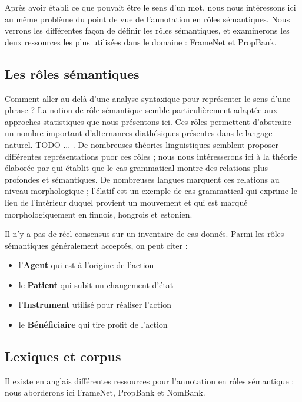 Après avoir établi ce que pouvait être le sens d'un mot, nous nous intéressons
ici au même problème du point de vue de l'annotation en rôles sémantiques. Nous
verrons les différentes façon de définir les rôles sémantiques, et examinerons
les deux ressources les plus utilisées dans le domaine : FrameNet et PropBank.

\subsection{Les rôles sémantiques}

Comment aller au-delà d'une analyse syntaxique pour représenter le sens d'une
phrase ? La notion de rôle sémantique semble particulièrement adaptée aux
approches statistiques que nous présentons ici. Ces rôles permettent
d'abstraire un nombre important d'alternances diathésiques présentes dans le
langage naturel. TODO ... . De nombreuses théories linguistiques semblent
proposer différentes représentations puor ces rôles ; nous nous intéresserons
ici à la théorie élaborée par \cite{fillmore1968case} qui établit que le cas
grammatical montre des relations plus profondes et sémantiques. De nombreuses
langues marquent ces relations au niveau morphologique ; l'élatif est un
exemple de cas grammatical qui exprime le lieu de l'intérieur duquel provient
un mouvement et qui est marqué morphologiquement en finnois, hongrois et
estonien.

Il n'y a pas de réel consensus sur un inventaire de cas donnés. Parmi les rôles
sémantiques généralement acceptés, on peut citer :

\begin{itemize}
    \item l'\textbf{Agent} qui est à l'origine de l'action
    \item le \textbf{Patient} qui subit un changement d'état
    \item l'\textbf{Instrument} utilisé pour réaliser l'action
    \item le \textbf{Bénéficiaire} qui tire profit de l'action
\end{itemize}

\subsection{Lexiques et corpus}

Il existe en anglais différentes ressources pour l'annotation en rôles
sémantique : nous aborderons ici FrameNet, PropBank et NomBank.

